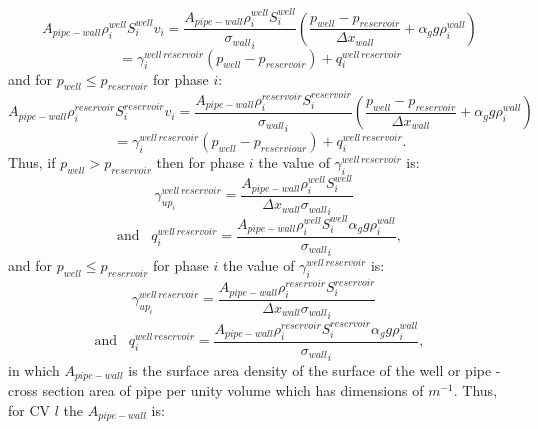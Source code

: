 \begin{equation}
A_{pipe-wall} \rho_i^{well} S_i^{well} v_i = \frac{A_{pipe-wall} \rho_i^{well} S_i^{well} }{{\sigma_{wall}}_i}
\left( \frac{ p_{well} - p_{reservoir} }{{\Delta x}_{wall}}  +\alpha_g g \rho_i^{wall}  \right)
\end{equation}
\begin{equation}
=\gamma_i^{well\, reservoir} (p_{well} - p_{reservoir}) + q_i^{well\, reservoir}
\label{saturation_wells_9}
\end{equation}
and for $p_{well}\leq p_{reservoir}$ for phase $i$:
\begin{equation}
A_{pipe-wall}  \rho_i^{reservoir} S_i^{reservoir} v_i = \frac{A_{pipe-wall}  \rho_i^{reservoir} S_i^{reservoir} }{{\sigma_{wall}}_i} \left(\frac{ p_{well} - p_{reservoir} }{{\Delta x}_{wall}} +\alpha_g g \rho_i^{wall}\right)
\end{equation}
\begin{equation}
=\gamma_i^{well\, reservoir} (p_{well} - p_{reserviour}) + q_i^{well\, reservoir}.
\label{saturation_wells_10}
\end{equation}
Thus, if $p_{well}>p_{reservoir}$ then for phase $i$ the value of $\gamma_i^{well\, reservoir}$ is:
\begin{equation}
\gamma_{up_i}^{well\, reservoir}=\frac{A_{pipe-wall}  \rho_i^{well} S_i^{well} }{{{\Delta x}_{wall}\sigma_{wall}}_i}
\;\;\;
\end{equation}
\begin{equation}
\text{and}
\;\;\;
q_{i}^{well\, reservoir}=\frac{A_{pipe-wall}  \rho_i^{well} S_i^{well} \alpha_g g \rho_i^{wall}    }
{{\sigma_{wall}}_i} ,
\label{saturation_wells_11}
\end{equation}
and for $p_{well}\leq p_{reservoir}$ for phase $i$ the value of $\gamma_i^{well\, reservoir}$ is:
\begin{equation}
\gamma_{up_i}^{well\, reservoir}=\frac{A_{pipe-wall}  \rho_i^{reservoir} S_i^{reservoir}   }
{{\Delta x}_{wall}{\sigma_{wall}}_i}
\;\;\;
\label{saturation_wells_12-gamma}
\end{equation}
\begin{equation}
\text{and}
\;\;\;
q_{i}^{well\, reservoir}=\frac{A_{pipe-wall}  \rho_i^{reservoir} S_i^{reservoir} \alpha_g g \rho_i^{wall}}
{{\sigma_{wall}}_i} ,
\label{saturation_wells_12}
\end{equation}
in which $A_{pipe-wall}$ is the surface area density of the surface of the well or pipe - cross section area of pipe per unity volume which has dimensions of $m^{-1}$. Thus, for CV $l$ the $A_{pipe-wall}$ is:
